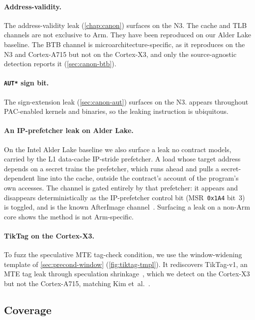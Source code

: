 \paragraph{Address-validity.}
The address-validity leak (\autoref{chap:canon}) surfaces on the N3. The cache and TLB channels are
not exclusive to Arm. They have been reproduced on our Alder Lake baseline. The BTB channel is
microarchitecture-specific, as it reproduces on the N3 and Cortex-A715 but not on the Cortex-X3, and
only the source-agnostic detection reports it (\autoref{sec:canon-btb}).

\paragraph{\texttt{AUT*} sign bit.}
The sign-extension leak (\autoref{sec:canon-aut}) surfaces on the N3.  appears
throughout PAC-enabled kernels and binaries, so the leaking instruction is ubiquitous.

\paragraph{An IP-prefetcher leak on Alder Lake.}
On the Intel Alder Lake baseline we also surface a leak no contract models, carried by the L1
data-cache IP-stride prefetcher. A load whose target address depends on a secret trains the
prefetcher, which runs ahead and pulls a secret-dependent line into the cache, outside the
contract's account of the program's own accesses. The channel is gated entirely by that prefetcher:
it appears and disappears deterministically as the IP-prefetcher control bit (MSR~\texttt{0x1A4}
bit~3) is toggled, and is the known AfterImage channel~\cite{afterimage}. Surfacing a leak on a
non-Arm core shows the method is not Arm-specific.

\paragraph{TikTag on the Cortex-X3.}
To fuzz the speculative MTE tag-check condition, we use the window-widening template of
\autoref{sec:precond-window} (\autoref{fig:tiktag-tmpl}). It rediscovers TikTag-v1, an MTE tag leak
through speculation shrinkage~\cite{tiktag}, which we detect on the Cortex-X3 but not the
Cortex-A715, matching Kim et~al.~\cite{tiktag}.

\subsection{Coverage}
\label{sec:eval-coverage}

